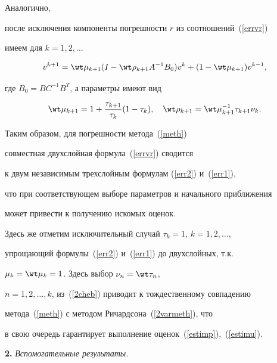 Аналогично,


после исключения компоненты погрешности $r$ из соотношений~(\ref{errvr})


имеем для $k = 1, 2, \dotsc$


\begin{equation}


\label{err1}


v^{k+1}=\wt \mu_{k+1}(I-\wt \rho_{k+1} A^{-1}B_0)v^k+(1-\wt\mu_{k+1})v^{k-1},


\end{equation}


где $B_0 = BC^{-1}B^T$, а параметры имеют вид


\begin{equation}


\label{parerr1}


\wt \mu_{k+1}=1 + \frac{\tau_{k+1}}{\tau_{k}} ( 1 - \tau_{k} ) , \quad


\wt \rho_{k+1} = \wt \mu_{k+1}^{-1} \tau_{k+1} \nu_{k}.


\end{equation}


Таким образом, для погрешности метода~(\ref{meth})


совместная двухслойная формула~(\ref{errvr}) сводится


к двум независимым трехслойным формулам (\ref{err2}) и~(\ref{err1}),


что при соответствующем выборе параметров и начального приближения


может привести к получению искомых оценок.





Здесь же отметим исключительный случай $\tau_k=1$, $k=1, 2, \dotsc$,


упрощающий формулы~(\ref{err2}) и~(\ref{err1}) до двухслойных, т.к.


$\mu_{k} = \wt \mu_{k} = 1$. Здесь выбор $\nu_n = \wt \tau_n$,


$n = 1, 2,\dotsc, k$, из~(\ref{2cheb}) приводит к тождественному совпадению


метода~(\ref{meth}) с методом Ричардсона~(\ref{2varmeth}), что


в свою очередь гарантирует выполнение оценок~(\ref{estimp}),~(\ref{estimu}).


\medskip





{\bf 2.} {\it Вспомогательные результаты.}


